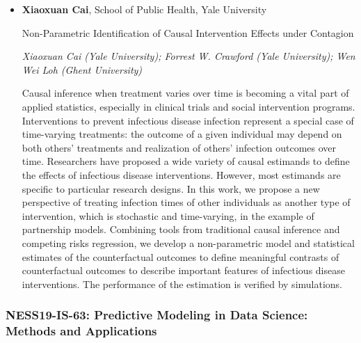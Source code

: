 \begin{itemize}
\item \textbf{Xiaoxuan Cai}, School of Public Health, Yale University

Non-Parametric Identification of Causal Intervention Effects under Contagion

\emph{\footnotesize Xiaoxuan Cai (Yale University); Forrest W. Crawford (Yale University); Wen Wei Loh (Ghent University)}

Causal inference when treatment varies over time is becoming a vital part of applied statistics, especially in clinical trials and social intervention programs. Interventions to prevent infectious disease infection represent a special case of time-varying treatments: the outcome of a given individual may depend on both others’ treatments and realization of others’ infection outcomes over time. Researchers have proposed a wide variety of causal estimands to define the effects of infectious disease interventions. However, most estimands are specific to particular research designs. In this work, we propose a new perspective of treating infection times of other individuals as another type of intervention, which is stochastic and time-varying, in the example of partnership models. Combining tools from traditional causal inference and competing risks regression, we develop a non-parametric model and statistical estimates of the counterfactual outcomes to define meaningful contrasts of counterfactual outcomes to describe important features of infectious disease interventions. The performance of the estimation is verified by simulations.

\end{itemize}

\subsubsection*{NESS19-IS-63: Predictive Modeling in Data Science: Methods and Applications}

